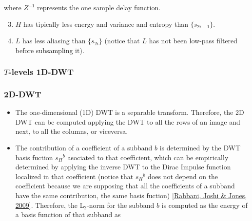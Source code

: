 where \(Z^{-1}\) represents the one sample delay function.

\begin{enumerate}
\setcounter{enumi}{2}
\tightlist
\item
  \(H\) has tipically less energy and variance and entropy than
  \(\{s_{2i+1}\}\).
\item
  \(L\) has less aliasing than \(\{s_{2i}\}\) (notice that \(L\) has not
  been low-pass filtered before subsampling it).
\end{enumerate}





    \hypertarget{t-levels-1d-dwt}{%
\subsubsection{\texorpdfstring{\(T\)-levels
1D-DWT}{T-levels 1D-DWT}}\label{t-levels-1d-dwt}}

    \hypertarget{d-dwt}{%
\subsubsection{2D-DWT}\label{d-dwt}}

\begin{itemize}
\tightlist
\item
  The one-dimensional (1D) DWT is a separable transform. Therefore, the
  2D DWT can be computed applying the DWT to all the rows of an image
  and next, to all the columns, or viceversa.
\end{itemize}

\begin{itemize}
\tightlist
\item
  The contribution of a coefficient of a subband \(b\) is determined by
  the DWT basis fuction \({s_H}^b\) asociated to that coefficient, which
  can be empirically determined by applying the inverse DWT to the Dirac
  Impulse function localized in that coefficient (notice that
  \({s_H}^b\) does not depend on the coefficient because we are
  supposing that all the coefficients of a subband have the same
  contribution, the same basis fuction)
  \href{https://scholar.google.es/scholar?hl=es\&as_sdt=0\%2C5\&q=Majid+Rabban\%2C+Rajan+L.+Joshi\%2C+and+Paul+W.+Jones.+The+JPEG+2000+Suite\%2C+chapter+JPEG+2000+Core+Coding+System+\%28Part+1\%29.+WILEY\%2C+2009\&btnG=}{{[}Rabbani,
  Joshi \& Jones, 2009{]}}. Therefore, the L\(_2\)-norm for the subband
  \(b\) is computed as the energy of a basis function of that subband as
\end{itemize}

